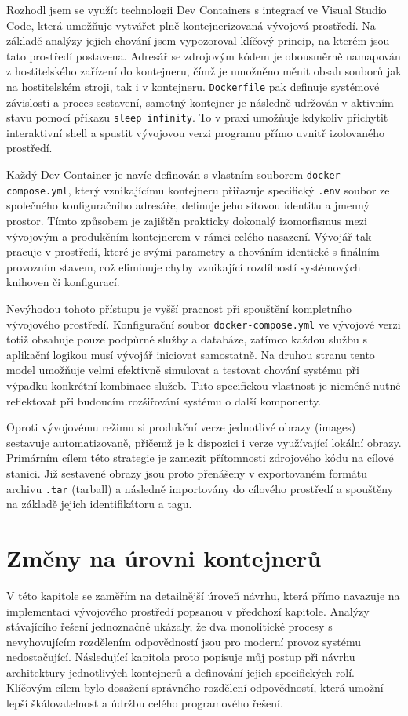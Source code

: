 \documentclass[FM,DP,fonts]{tulthesis}
\begin{document}
Rozhodl jsem se využít technologii Dev Containers s integrací ve Visual Studio Code, která umožňuje vytvářet plně kontejnerizovaná vývojová prostředí. Na základě analýzy jejich chování jsem vypozoroval klíčový princip, na kterém jsou tato prostředí postavena. Adresář se zdrojovým kódem je obousměrně namapován z hostitelského zařízení do kontejneru, čímž je umožněno měnit obsah souborů jak na hostitelském stroji, tak i v kontejneru. \texttt{Dockerfile} pak definuje systémové závislosti a proces sestavení, samotný kontejner je následně udržován v aktivním stavu pomocí příkazu \texttt{sleep infinity}. To v praxi umožňuje kdykoliv přichytit interaktivní shell a spustit vývojovou verzi programu přímo uvnitř izolovaného prostředí.

Každý Dev Container je navíc definován s vlastním souborem \texttt{docker-compose.yml}, který vznikajícímu kontejneru přiřazuje specifický \texttt{.env} soubor ze společného konfiguračního adresáře, definuje jeho síťovou identitu a jmenný prostor. Tímto způsobem je zajištěn prakticky dokonalý izomorfismus mezi vývojovým a produkčním kontejnerem v rámci celého nasazení. Vývojář tak pracuje v prostředí, které je svými parametry a chováním identické s finálním provozním stavem, což eliminuje chyby vznikající rozdílností systémových knihoven či konfigurací.

Nevýhodou tohoto přístupu je vyšší pracnost při spouštění kompletního vývojového prostředí. Konfigurační soubor \texttt{docker-compose.yml} ve vývojové verzi totiž obsahuje pouze podpůrné služby a databáze, zatímco každou službu s aplikační logikou musí vývojář iniciovat samostatně. Na druhou stranu tento model umožňuje velmi efektivně simulovat a testovat chování systému při výpadku konkrétní kombinace služeb. Tuto specifickou vlastnost je nicméně nutné reflektovat při budoucím rozšiřování systému o další komponenty.

Oproti vývojovému režimu si produkční verze jednotlivé obrazy (images) sestavuje automatizovaně, přičemž je k dispozici i verze využívající lokální obrazy. Primárním cílem této strategie je zamezit přítomnosti zdrojového kódu na cílové stanici. Již sestavené obrazy jsou proto přenášeny v exportovaném formátu archivu \texttt{.tar} (tarball) a následně importovány do cílového prostředí a spouštěny na základě jejich identifikátoru a tagu.
\clearpage

\section{Změny na úrovni kontejnerů}
V této kapitole se zaměřím na detailnější úroveň návrhu, která přímo navazuje na implementaci vývojového prostředí popsanou v předchozí kapitole. Analýzy stávajícího řešení jednoznačně ukázaly, že dva monolitické procesy s nevyhovujícím rozdělením odpovědností jsou pro moderní provoz systému nedostačující. Následující kapitola proto popisuje můj postup při návrhu architektury jednotlivých kontejnerů a definování jejich specifických rolí. Klíčovým cílem bylo dosažení správného rozdělení odpovědností, která umožní lepší škálovatelnost a údržbu celého programového řešení.
\end{document}
